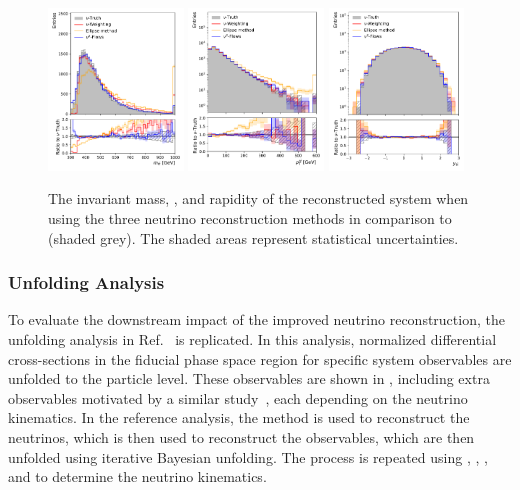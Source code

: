 \begin{figure}[tbp]
    \centering
    \includegraphics[width=0.32\textwidth]{Figures/neutrino_unfolding/ttbar_reco/ttbar_m.pdf}
    \includegraphics[width=0.32\textwidth]{Figures/neutrino_unfolding/ttbar_reco/ttbar_pt.pdf}
    \includegraphics[width=0.32\textwidth]{Figures/neutrino_unfolding/ttbar_reco/ttbar_rapidity.pdf}
    \caption{The invariant mass, \pt, and rapidity of the reconstructed \ttbar system when using the three neutrino reconstruction methods in comparison to \vtruth (shaded grey). The shaded areas represent statistical uncertainties.}
    \label{fig:ttbar_kin}
\end{figure}

\subsubsection{Unfolding Analysis}

To evaluate the downstream impact of the improved neutrino reconstruction, the unfolding analysis in Ref.~\cite{ATLAS:2016pbv} is replicated.
In this analysis, normalized differential cross-sections in the fiducial phase space region for specific \ttbar system observables are unfolded to the particle level.
These observables are shown in , including extra observables motivated by a similar study~\cite{CMS:2017iqf}, each depending on the neutrino kinematics.
In the reference analysis, the \vweight method is used to reconstruct the neutrinos, which is then used to reconstruct the observables, which are then unfolded using iterative Bayesian unfolding.
The process is repeated using \vvflows, \vweight, \ellipse, and \vtruth to determine the neutrino kinematics.

